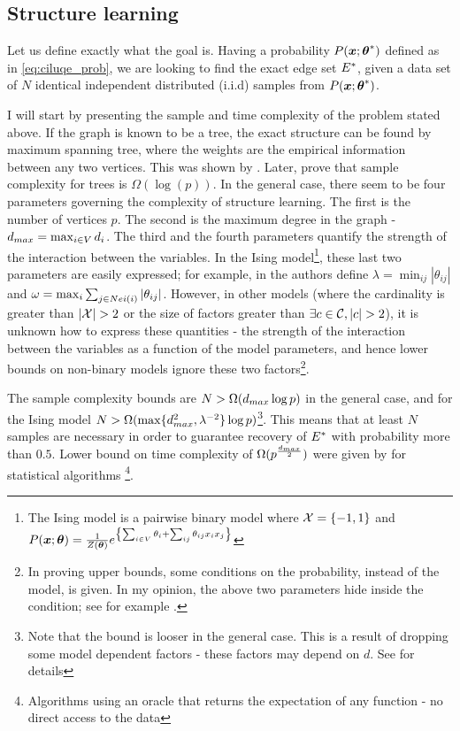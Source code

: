\subsection{Structure learning}
\label{sec:structure}
Let us define exactly what the goal is.
Having a probability $P(\boldsymbol{x};{\boldsymbol{\theta}}^{*})$ defined as in \eqref{eq:ciluqe_prob},
we are looking to find the exact edge set ${E}^{*}$, given a data set of $N$ identical independent distributed (i.i.d) samples from $P(\boldsymbol{x};{\boldsymbol{\theta}}^{*})$.

I will start by presenting the sample and time complexity of the problem stated above. 
If the graph is known to be a tree, the exact structure can be found by maximum spanning tree, where the weights are the empirical information between any two vertices. This was shown by \cite{chowLiu}. 
Later, \cite{tan2011learning} prove that sample complexity for trees is $\Omega(\log(p))$.
In the general case, there seem to be four parameters governing the complexity of structure learning.
The first is the number of vertices $p$.
The second is the maximum degree in the graph - $d_{max} = \max_{i \in V} d_i$.
The third and the fourth parameters quantify the strength of the interaction between the variables.
In the Ising model\footnote{ The Ising model is a pairwise binary model where ${\cal X} = \{-1,1\}$ and $P(\boldsymbol{x};\boldsymbol{\theta}) = \frac{1}{Z(\boldsymbol{\theta})} e^{\left\{\sum_{i \in V}\theta_i + \sum_{ij}\theta_{ij}x_ix_j\right\}}$}, these last two parameters are easily expressed; for example, in \cite{santhanam2012information} the authors define $\lambda = \min_{ij} |\theta_{ij}|$ and $\omega = \max_i \sum_{j \in Nei(i)} |\theta_{ij}|$.
However, in other models (where the cardinality is greater than $|\cX|>2$ or the size of factors greater than $\exists c \in \cC, |c|>2$), it is unknown how to express these quantities - the strength of the interaction between the variables as a function of the model parameters, and hence lower bounds on non-binary models ignore these two factors\footnote{In proving upper bounds, some conditions on the probability, instead of the model, is given. In my opinion, the above two parameters hide inside the condition; see for example \cite{bresler2008reconstruction}.}.

The sample complexity bounds are $N > \Omega(d_{max} \log p)$ in the general case, and for the Ising model $N > \Omega(\max\{d_{max}^2, \lambda^{-2}\}\log p)$\footnote{Note that the bound is looser in the general case. This is a result of dropping some model dependent factors - these factors may depend on $d$. See \cite{bresler2008reconstruction} for details}.
This means that at least $N$ samples are necessary in order to guarantee recovery of ${E}^{*}$ with probability more than $0.5$.
Lower bound on time complexity of $\Omega(p^{\frac{d_{max}}{2}})$ were given by \cite{bresler2014structure} for statistical algorithms \cite{feldman2013statistical}\footnote{Algorithms using an oracle that returns the expectation of any function - no direct access to the data}.

